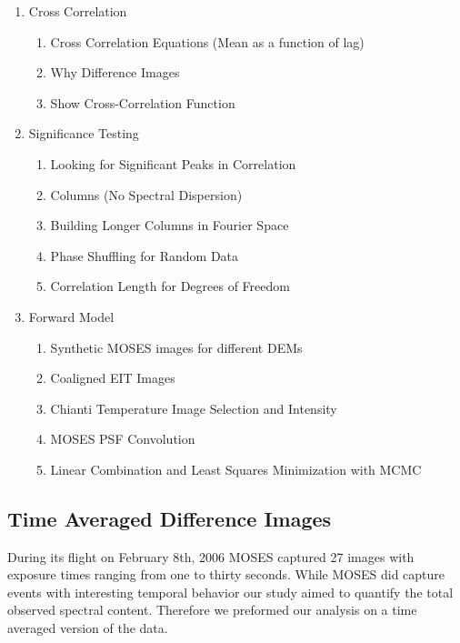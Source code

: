 \documentclass[]{solarphysics}
\begin{document}
\begin{article}
\begin{enumerate}
			\item Cross Correlation
				\begin{enumerate}
					\item Cross Correlation Equations (Mean as a function of lag)
					\item Why Difference Images
					\item Show Cross-Correlation Function
				\end{enumerate}
			
			\item Significance Testing
				\begin{enumerate}
					\item Looking for Significant Peaks in Correlation
					\item Columns (No Spectral Dispersion)
					\item Building Longer Columns in Fourier Space
					\item Phase Shuffling for Random Data
					\item Correlation Length for Degrees of Freedom
				\end{enumerate}
			
			\item Forward Model
				\begin{enumerate}
					\item Synthetic MOSES images for different DEMs
					\item Coaligned EIT Images
					\item Chianti Temperature Image Selection and Intensity
					\item MOSES PSF Convolution
					\item Linear Combination and Least Squares Minimization with MCMC
				\end{enumerate}
		\end{enumerate}
	

	
 		
 	\subsection{Time Averaged Difference Images}	
 	
 	During its flight on February 8th, 2006 MOSES captured 27 images with exposure times ranging from one to thirty seconds. While MOSES did capture events with interesting temporal behavior \citep{Fox2010,Rust2017} our study aimed to quantify the total observed spectral content. Therefore we preformed our analysis on a time averaged version of the data.
 	

\end{article}
\end{document}
